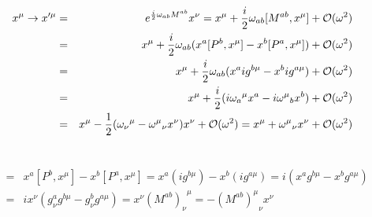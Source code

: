 \documentclass[11pt]{article}
\begin{document}
\section{ }
\begin{eqnarray}
  x^\mu \to x'^\mu 
  &=& e^{\frac{i}{2} \omega_{ab} M^{ab}} x^\nu = x^\mu + \frac{i}{2} \omega_{ab} [M^{ab}, x^\mu ]+ {\cal O}(\omega^2) \\
  &=&  x^\mu + \frac{i}{2} \omega_{ab} (x^a[P^b, x^\mu ] -x^b [P^a, x^\mu ])+ {\cal O}(\omega^2) \\
  &=&  x^\mu +\frac{i}{2} \omega_{ab} (x^a ig^{b\mu} -x^b ig^{a\mu })+ {\cal O}(\omega^2) \\
  &=&  x^\mu +\frac{i}{2} (i {\omega_a}^\mu x^a -  i {\omega^\mu}_b x^b )+ {\cal O}(\omega^2) \\
  &=&  x^\mu -\frac{1}{2} ( {\omega_\nu}^\mu -  {\omega^\mu}_\nu x^\nu )x^\nu + {\cal O}(\omega^2)= x^\mu + {\omega^\mu}_\nu x^\nu+ {\cal O}(\omega^2)
\end{eqnarray}

\section{ }
\begin{eqnarray}
  [M^{ab}, x^\mu]  &=& x^a [P^b, x^\mu] - x^b [P^a, x^\mu]
  = x^a (i g^{b\mu}) - x^b (i g^{a\mu})=i ( x^a g^{b\mu} - x^b g^{a\mu} ) \\ 
  &=& i x^\nu ( g^a_\nu g^{b\mu} - g^b_\nu g^{a\mu} )
  = x^\nu {(M^{ab})_\nu}^\mu
  = -{(M^{ab})^\mu}_\nu x^\nu
\end{eqnarray}
\end{document}
